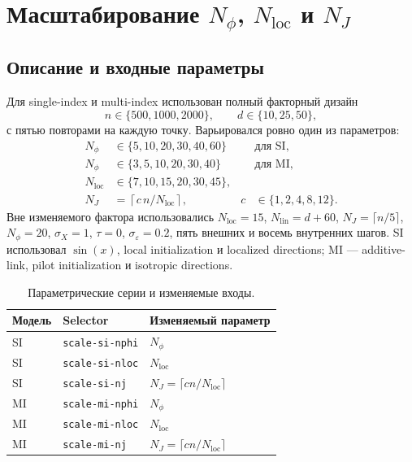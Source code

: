 \documentclass[11pt,a4paper]{article}
\newcommand{\code}[1]{\texttt{#1}}
\begin{document}
\section{Масштабирование \texorpdfstring{$N_\phi$, $N_{\mathrm{loc}}$ и
$N_J$}{Nphi, Nloc и NJ}}

\subsection{Описание и входные параметры}

Для single-index и multi-index использован полный факторный дизайн
\begin{equation}
    n\in\{500,1000,2000\},\qquad
    d\in\{10,25,50\},
\end{equation}
с пятью повторами на каждую точку. Варьировался ровно один из параметров:
\begin{align}
 N_\phi &\in \{5,10,20,30,40,60\} &&\text{для SI},\\
 N_\phi &\in \{3,5,10,20,30,40\} &&\text{для MI},\\
 N_{\mathrm{loc}} &\in \{7,10,15,20,30,45\},\\
 N_J &= \left\lceil c\,n/N_{\mathrm{loc}}\right\rceil,
 &c&\in\{1,2,4,8,12\}.
\end{align}
Вне изменяемого фактора использовались $N_{\mathrm{loc}}=15$,
$N_{\mathrm{lin}}=d+60$, $N_J=\lceil n/5\rceil$, $N_\phi=20$,
$\sigma_X=1$, $\tau=0$, $\sigma_\varepsilon=0.2$, пять внешних и восемь
внутренних шагов. SI использовал $\sin(x)$, local initialization и localized
directions; MI --- additive-link, pilot initialization и isotropic directions.

\begin{table}[ht]
\centering
\small
\begin{tabular}{l|l|l}
\hline
Модель & Selector & Изменяемый параметр \\
\hline
SI & \code{scale-si-nphi} & $N_\phi$ \\
SI & \code{scale-si-nloc} & $N_{\mathrm{loc}}$ \\
SI & \code{scale-si-nj} & $N_J=\lceil c n/N_{\mathrm{loc}}\rceil$ \\
MI & \code{scale-mi-nphi} & $N_\phi$ \\
MI & \code{scale-mi-nloc} & $N_{\mathrm{loc}}$ \\
MI & \code{scale-mi-nj} & $N_J=\lceil c n/N_{\mathrm{loc}}\rceil$ \\
\hline
\end{tabular}
\caption{Параметрические серии и изменяемые входы.}
\label{tab:param-selectors}
\end{table}
\end{document}
